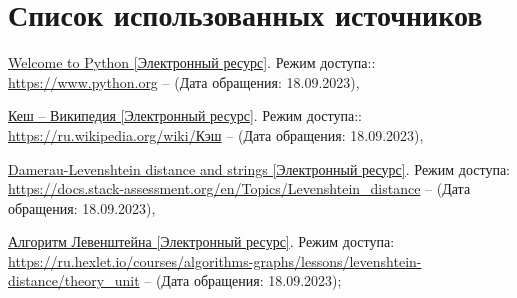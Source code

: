 \chapter*{Список использованных источников}

\begin{enumerate}[label = {[\arabic*]}]
	\item \href{https://www.python.org}{Welcome to Python [Электронный ресурс]}. Режим доступа:: \href{https://www.python.org}{https://www.python.org} -- (Дата обращения: 18.09.2023),
	\item \href{https://ru.wikipedia.org/wiki/Кэш}{Кеш -- Википедия [Электронный ресурс]}. Режим доступа:: \href{https://ru.wikipedia.org/wiki/Кэш}{https://ru.wikipedia.org/wiki/Кэш} -- (Дата обращения: 18.09.2023),
	\item \href{https://docs.stack-assessment.org/en/Topics/Levenshtein_distance}{Damerau-Levenshtein distance and strings [Электронный ресурс]}. Режим доступа: \href{https://docs.stack-assessment.org/en/Topics/Levenshtein_distance}{https://docs.stack-assessment.org/en/Topics/Levenshtein\_distance} -- (Дата обращения: 18.09.2023),
	\item \href{https://ru.hexlet.io/courses/algorithms-graphs/lessons/levenshtein-distance/theory_unit}{Алгоритм Левенштейна [Электронный ресурс]}. Режим доступа: \href{https://ru.hexlet.io/courses/algorithms-graphs/lessons/levenshtein-distance/theory_unit}{https://ru.hexlet.io/courses/algorithms-graphs/lessons/levenshtein-distance/theory\_unit} -- (Дата обращения: 18.09.2023);
	
\end{enumerate}
